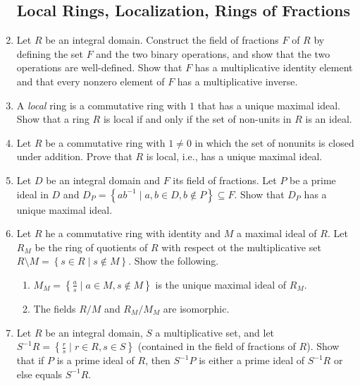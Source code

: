 \documentclass{article}
\theoremstyle{definition}
\newcommand{\set}[1]{\left\{#1\right\}}
\newcommand{\inv}[1]{{#1}^{-1}}
\begin{document}
\begin{enumerate}
        \subsection{Local Rings, Localization, Rings of Fractions}

            \item Let $R$ be an integral domain. Construct the field of fractions $F$ of $R$ by defining the set $F$ and the two binary operations, and show that the two operations are well-defined. Show that $F$ has a multiplicative identity element and that every nonzero element of $F$ has a multiplicative inverse.
            
            \item A \textit{local} ring is a commutative ring with $1$ that has a unique maximal ideal. Show that a ring $R$ is local if and only if the set of non-units in $R$ is an ideal. 
            
            \item Let $R$ be a commutative ring with $1\neq 0$ in which the set of nonunits is closed under addition. Prove that $R$ is local, i.e., has a unique maximal ideal.
            
            \item Let $D$ be an integral domain and $F$ its field of fractions. Let $P$ be a prime ideal in $D$ and $D_P=\set{ab^{-1} \mid a,b\in D, b\notin P} \subseteq F$. Show that $D_P$ has a unique maximal ideal.
            
            \item Let $R$ he a commutative ring with identity and $M$ a maximal ideal of $R$. Let $R_M$ be the ring of quotients of $R$ with respect ot the multiplicative set $R\setminus M=\set{s\in R \mid s\notin M}$. Show the following.
            
            \begin{enumerate}
                \item $M_M=\set{\frac{a}{s} \mid a\in M, s\notin M}$ is the unique maximal ideal of $R_M$.
                \item The fields $R/M$ and $R_M/M_M$ are isomorphic.
            \end{enumerate}

            \item Let $R$ be an integral domain, $S$ a multiplicative set, and let $\inv{S}R=\set{\frac{r}{s} \mid r\in R, s\in S}$ (contained in the field of fractions of $R$). Show that if $P$ is a prime ideal of $R$, then $\inv{S}P$ is either a prime ideal of $\inv{S}R$ or else equals $\inv{S}R$.
            

\end{enumerate}
\end{document}
